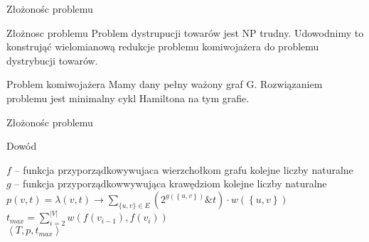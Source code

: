 \begin{frame}{Złożonośc problemu}
	\begin{block}{Złożnosc problemu}
		Problem dystrupucji towarów jest NP trudny.
		Udowodnimy to konstrująć wielomianową redukcje problemu komiwojażera do problemu dystrybucji towarów.
	\end{block}

	\begin{block}{Problem komiwojażera}
		Mamy dany pełny ważony graf G. Rozwiązaniem problemu jest minimalny cykl Hamiltona na tym grafie.
	\end{block}
\end{frame}

\begin{frame}{Złożonośc problemu}
	\begin{block}{Dowód}
		
		\begin{algorithm}[H]
			$f$ -- funkcja przyporządkowywujaca wierzchołkom grafu kolejne liczby naturalne \\
			$g$ -- funkcja przyporządkowwywująca krawędziom kolejne liczby naturalne \\
			$p(v, t) = \lambda\left( v, t \right) \rightarrow \sum_{\{u, v\} \in E} (2^{g(\left\{u, v\right\})} \& t) \cdot w(\left\{ u, v \right\}) $ \\
			$t_{max} = \sum\limits_{i=2}^{|V|} w(f(v_{i-1}), f(v_i))$ \\
			\Return $\left< T, p , t_{max} \right> $
		\end{algorithm}
	
	\end{block}

\end{frame}
